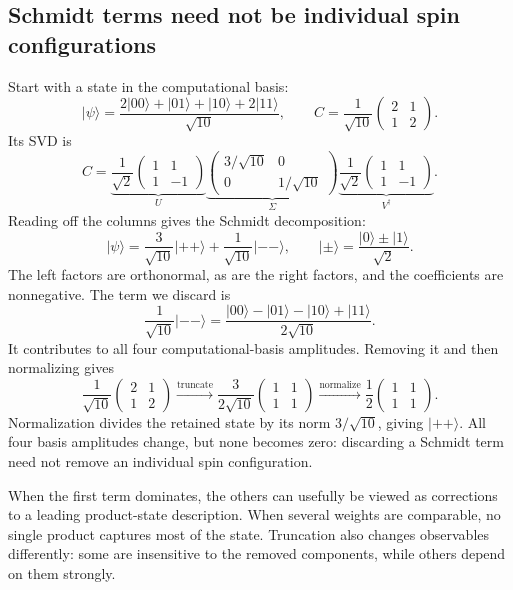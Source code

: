 \documentclass[11pt]{article}
\newcommand{\ket}[1]{\lvert #1\rangle}
\newcommand{\mtwo}[4]{\begin{pmatrix}#1&#2\\#3&#4\end{pmatrix}}
\begin{document}
\subsection*{Schmidt terms need not be individual spin configurations}
Start with a state in the computational basis:
\begin{equation}
\ket\psi=\frac{2\ket{00}+\ket{01}+\ket{10}+2\ket{11}}{\sqrt{10}},
\qquad C=\frac1{\sqrt{10}}\mtwo{2}{1}{1}{2}.
\end{equation}
Its SVD is
\begin{equation}
C=\underbrace{\frac1{\sqrt2}\mtwo{1}{1}{1}{-1}}_U
\underbrace{\mtwo{3/\sqrt{10}}{0}{0}{1/\sqrt{10}}}_{\Sigma}
\underbrace{\frac1{\sqrt2}\mtwo{1}{1}{1}{-1}}_{V^\dagger}.
\end{equation}
Reading off the columns gives the Schmidt decomposition:
\begin{equation}
\ket\psi=\frac3{\sqrt{10}}\ket{++}+\frac1{\sqrt{10}}\ket{--},
\qquad \ket\pm=\frac{\ket0\pm\ket1}{\sqrt2}.
\end{equation}
The left factors are orthonormal, as are the right factors, and the coefficients are nonnegative. The term we discard is
\begin{equation}
\frac1{\sqrt{10}}\ket{--}
=\frac{\ket{00}-\ket{01}-\ket{10}+\ket{11}}{2\sqrt{10}}.
\end{equation}
It contributes to all four computational-basis amplitudes. Removing it and then normalizing gives
\begin{equation}
\frac1{\sqrt{10}}\mtwo{2}{1}{1}{2}
\xrightarrow{\text{truncate}}
\frac3{2\sqrt{10}}\mtwo{1}{1}{1}{1}
\xrightarrow{\text{normalize}}
\frac12\mtwo{1}{1}{1}{1}.
\end{equation}
Normalization divides the retained state by its norm $3/\sqrt{10}$, giving $\ket{++}$. All four basis amplitudes change, but none becomes zero: discarding a Schmidt term need not remove an individual spin configuration.

When the first term dominates, the others can usefully be viewed as corrections to a leading product-state description. When several weights are comparable, no single product captures most of the state. Truncation also changes observables differently: some are insensitive to the removed components, while others depend on them strongly.

\newpage
\end{document}
